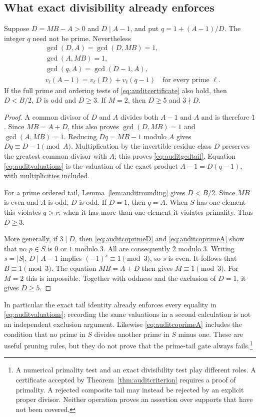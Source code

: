 \subsection{What exact divisibility already enforces}
\begin{proposition}
\label{prop:auditconsequences}
Suppose $D=MB-A>0$ and $D\mid A-1$, and put $q=1+(A-1)/D$.
The integer $q$ need not be prime. Nevertheless
\begin{align}
 &\gcd(D,A)=\gcd(D,MB)=1,\label{eq:auditcoprimeD}\\
 &\gcd(A,MB)=1,\label{eq:auditcoprimeA}\\
 &\gcd(q,A)=\gcd(D-1,A),\label{eq:auditgcdtail}\\
 &v_\ell(A-1)=v_\ell(D)+v_\ell(q-1)
 \quad\text{for every prime }\ell.\label{eq:auditvaluations}
\end{align}
If the full prime and ordering tests of
\eqref{eq:auditcertificate} also hold, then $D<B/2$, $D$ is odd and
$D\ge3$. If $M=2$, then $D\ge5$ and $3\nmid D$.
\end{proposition}
\begin{proof}
A common divisor of $D$ and $A$ divides both $A-1$ and $A$ and is
therefore $1$. Since $MB=A+D$, this also proves
$\gcd(D,MB)=1$ and $\gcd(A,MB)=1$. Reducing $Dq=MB-1$ modulo
$A$ gives $Dq\equiv D-1\pmod A$. Multiplication by the invertible
residue class $D$ preserves the greatest common divisor with $A$;
this proves \eqref{eq:auditgcdtail}. Equation
\eqref{eq:auditvaluations} is the valuation of the exact product
$A-1=D(q-1)$, with multiplicities included.

For a prime ordered tail, Lemma~\ref{lem:auditrounding} gives
$D<B/2$. Since $MB$ is even and $A$ is odd, $D$ is odd. If $D=1$,
then $q=A$. When $S$ has one element this violates $q>r$; when it
has more than one element it violates primality. Thus $D\ge3$.

More generally, if $3\mid D$, then \eqref{eq:auditcoprimeD} and
\eqref{eq:auditcoprimeA} show that no $p\in S$ is $0$ or $1$
modulo $3$. All are consequently $2$ modulo $3$. Writing $s=|S|$,
$D\mid A-1$ implies $(-1)^s\equiv1\pmod3$, so $s$ is even.
It follows that $B\equiv1\pmod3$. The equation $MB=A+D$ then
gives $M\equiv1\pmod3$. For $M=2$ this is impossible. Together
with oddness and the exclusion of $D=1$, it gives $D\ge5$.
\end{proof}

In particular the exact tail identity already enforces every equality
in \eqref{eq:auditvaluations}; recording the same valuations in a
second calculation is not an independent exclusion argument. Likewise
\eqref{eq:auditcoprimeA} includes the condition that no prime in $S$
divides another prime in $S$ minus one. These are useful pruning rules,
but they do not prove that the prime-tail gate always fails.\footnote{A
numerical primality test and an exact divisibility test play different
roles. A certificate accepted by Theorem~\ref{thm:auditcriterion}
requires a proof of primality. A rejected composite tail may instead
be rejected by an explicit proper divisor. Neither operation proves
an assertion over supports that have not been covered.}

